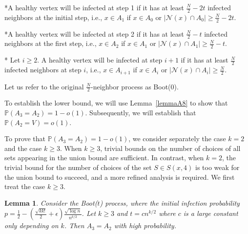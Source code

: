 \documentclass[reqno,11pt]{amsart}
\newtheorem{lemma}[theorem]{Lemma}
\renewcommand{\geq}{\geqslant}
\begin{document}
*A healthy vertex will be infected at step 1 if it has at least $\frac{N}{2}-2t$ infected neighbors at the initial step, i.e., $x \in A_1$ if $x \in A_0$ or $|\mathcal{N}(x) \cap A_0| \geq \frac{N}{2}-2t$.

*A healthy vertex will be infected at step 2 if it has at least $\frac{N}{2}-t$ infected neighbors at the first step, i.e., $x \in A_2$ if $x \in A_1$ or $|\mathcal{N}(x) \cap A_1| \geq \frac{N}{2}-t$.


* Let $i \geq 2$. A healthy vertex will be infected at step $i+1$ if it has at least $\frac{N}{2}$ infected neighbors at step $i$, i.e., $x \in A_{i+1}$ if $x \in A_i$ or $|\mathcal{N}(x) \cap A_i| \geq \frac{N}{2}$.

Let us refer to the original $\frac{N}{2}$-neighbor process as Boot($0$).

To establish the lower bound, we will use Lemma~\ref{lemmaA8} to show that $\mathbb{P}(A_3=A_2)=1-o(1)$. Subsequently, we will establish that $\mathbb{P}(A_2=V)=o(1).$

To prove that $\mathbb{P}(A_3 = A_2) = 1 - o(1)$, we consider separately the case $k = 2$ and the case $k \geq 3$. When $k\geq 3$, trivial bounds on the number of choices of all sets appearing in the union bound are sufficient. In contrast, when $k=2$, the trivial bound for the number of choices of the set $S \in S(x,4)$ is too weak for the union bound to succeed, and a more refined analysis is required. We first treat the case $k\geq 3$.




\begin{lemma} \label{lemmaA17}
 Consider the Boot($t$) process, where the initial infection probability $p= \frac{1}{2}-(\frac{\sqrt{kk!}}{2}+\epsilon) \frac{ \sqrt{\log n}}{n^{k/2}}$.  Let $k \geq3$ and $t=cn^{k/2}$ where $c$ is a large constant only depending on $k$. Then $A_3=A_2$ with high probability.
\end{lemma}
\end{document}
